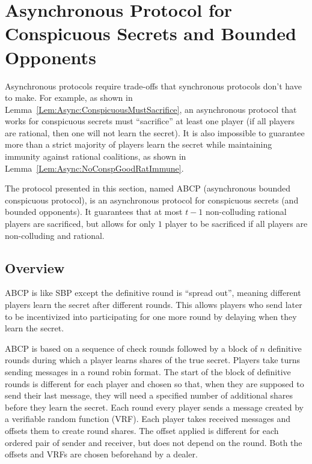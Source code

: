 \documentclass[12pt]{dalcsthesis}
\begin{document}
 




\section{Asynchronous Protocol for Conspicuous Secrets and Bounded Opponents}
\label{Sec:ABCP}

Asynchronous protocols require trade-offs that synchronous protocols don't have to make. For example, as shown in Lemma~\ref{Lem:Async:ConspicuousMustSacrifice}, an asynchronous protocol that works for conspicuous secrets must ``sacrifice'' at least one player (if all players are rational, then one will not learn the secret). It is also impossible to guarantee more than a strict majority of players learn the secret while maintaining immunity against rational coalitions, as shown in Lemma~\ref{Lem:Async:NoConspGoodRatImmune}.

The protocol presented in this section, named ABCP (asynchronous bounded conspicuous protocol), is an asynchronous protocol for conspicuous secrets (and bounded opponents). It guarantees that at most $t-1$ non-colluding rational players are sacrificed, but allows for only $1$ player to be sacrificed if all players are non-colluding and rational.

\subsection{Overview}

ABCP is like SBP except the definitive round is ``spread out'', meaning different players learn the secret after different rounds. This allows players who send later to be incentivized into participating for one more round by delaying when they learn the secret.
 
ABCP is based on a sequence of check rounds followed by a block of $n$ definitive rounds during which a player learns shares of the true secret. Players take turns sending messages in a round robin format. The start of the block of definitive rounds is different for each player and chosen so that, when they are supposed to send their last message, they will need a specified number of additional shares before they learn the secret. Each round every player sends a message created by a verifiable random function (VRF). Each player takes received messages and offsets them to create round shares. The offset applied is different for each ordered pair of sender and receiver, but does not depend on the round. Both the offsets and VRFs are chosen beforehand by a dealer.
\end{document}
